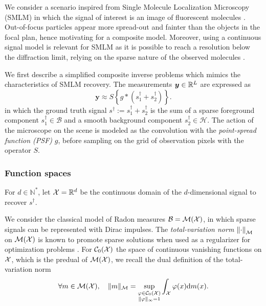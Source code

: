 \documentclass[12pt]{article}
\begin{document}
        We consider a scenario inspired from Single Molecule Localization Microscopy (SMLM) in which the signal of interest is an image of fluorescent molecules \cite{sage2019smlm}. Out-of-focus particles appear more spread-out and fainter than the objects in the focal plan, hence motivating for a composite model. Moreover, using a continuous signal model is relevant for SMLM as it is possible to reach a resolution below the diffraction limit, relying on the sparse nature of the observed molecules \cite{huang2017super,denoyelle2019sliding,laville2021sparse}.


        We first describe a simplified composite inverse problems which mimics the characteristics of SMLM recovery. The measurements $\bm{y}\in\mathbb{R}^L$ are expressed as
        \begin{equation*}
            \bm{y} \approx S \left\{g * (s_1^\dagger + s_2^\dagger)\right\}.
        \end{equation*}
        in which the ground truth signal $s^\dagger := s_1^\dagger + s_2^\dagger$ is the sum of a sparse foreground component $s_1^\dagger \in \mathcal{B}$ and a smooth background component $s_2^\dagger \in \mathcal{H}$. The action of the microscope on the scene is modeled as the convolution with the \emph{point-spread function (PSF)} $g$, before sampling on the grid of observation pixels with the operator $S$.


        \subsubsection{Function spaces}
            For $d \in \mathbb{N}^*$, let $\mathcal{X} = \mathbb{R}^d$ be the continuous domain of the $d$-dimensional signal to recover $s^\dagger$. 

            We consider the classical model of Radon measures $\mathcal{B} = {\mathcal{M}}({\mathcal{X}})$, in which sparse signals can be represented with Dirac impulses. The \textit{total-variation norm} $\left\lVert\cdot\right\rVert_\mathcal{M}$ on ${\mathcal{M}}({\mathcal{X}})$ is known to promote sparse solutions when used as a regularizer for optimization problems \cite{unser2017splines}. For ${\mathcal{C}}_0({\mathcal{X}})$ the space of continuous vanishing functions on $\mathcal{X}$, which is the predual of ${\mathcal{M}}({\mathcal{X}})$, we recall the dual definition of the total-variation norm
            \begin{equation*}
                \forall m \in {\mathcal{M}}({\mathcal{X}}), \quad \lVert m \rVert_\mathcal{M} = \underset{\substack{\varphi \in {\mathcal{C}}_0({\mathcal{X}}) \\ \| \varphi \|_\infty = 1}}{\sup} \int_{\mathcal{X}} \varphi(x) \mathrm{d}m(x).
            \end{equation*}
            
\end{document}
